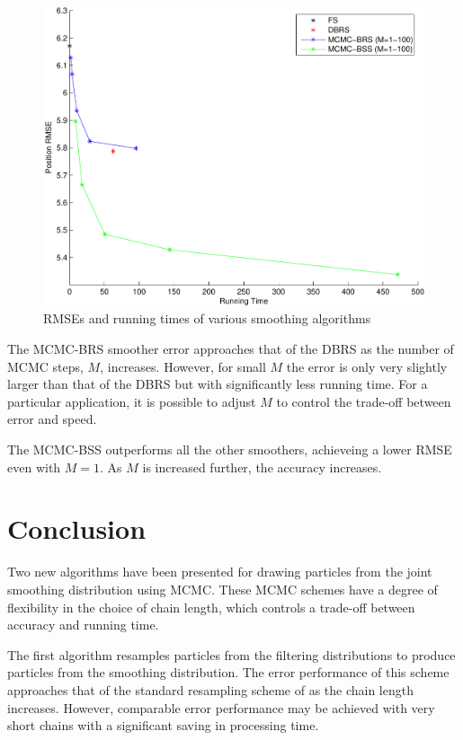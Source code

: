 \documentclass[journal]{IEEEtran}
\begin{document}
\begin{figure}[!t]
\centering
\includegraphics[width=0.8\columnwidth]{case2_smoother_comparison_posRMSE_time-crop.pdf}%
\caption{RMSEs and running times of various smoothing algorithms}%
\label{fig:case2_rmse_vs_time}%
\end{figure}

The MCMC-BRS smoother error approaches that of the DBRS as the number of MCMC steps, $M$, increases. However, for small $M$ the error is only very slightly larger than that of the DBRS but with significantly less running time. For a particular application, it is possible to adjust $M$ to control the trade-off between error and speed.

The MCMC-BSS outperforms all the other smoothers, achieveing a lower RMSE even with $M=1$. As $M$ is increased further, the accuracy increases.



\section{Conclusion} \label{sec:conclusions}
Two new algorithms have been presented for drawing particles from the joint smoothing distribution using MCMC. These MCMC schemes have a degree of flexibility in the choice of chain length, which controls a trade-off between accuracy and running time.

The first algorithm resamples particles from the filtering distributions to produce particles from the smoothing distribution. The error performance of this scheme approaches that of the standard resampling scheme of \cite{Godsill2004} as the chain length increases. However, comparable error performance may be achieved with very short chains with a significant saving in processing time.
\end{document}
